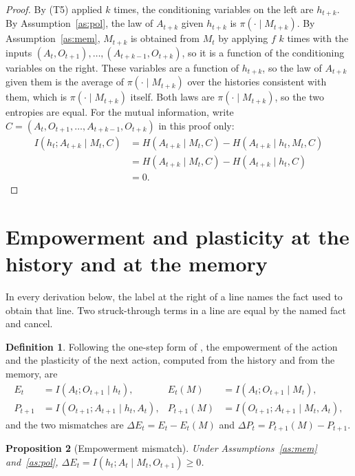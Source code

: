 \documentclass{article}
\newtheorem{proposition}{Proposition}[section]
\theoremstyle{definition}
\newtheorem{definition}[proposition]{Definition}
\theoremstyle{remark}
\newcommand{\dE}{\Delta E}
\newcommand{\dP}{\Delta P}
\newcommand{\why}[1]{\tag*{\small(#1)}}
\begin{document}
\begin{proof}
By (T5) applied $k$ times, the conditioning variables on the left are $h_{t+k}$. By Assumption~\ref{as:pol}, the law of $A_{t+k}$ given $h_{t+k}$ is $\pi(\cdot\mid M_{t+k})$. By Assumption~\ref{as:mem}, $M_{t+k}$ is obtained from $M_t$ by applying $f$ $k$ times with the inputs $(A_t,O_{t+1}),\dots,(A_{t+k-1},O_{t+k})$, so it is a function of the conditioning variables on the right. These variables are a function of $h_{t+k}$, so the law of $A_{t+k}$ given them is the average of $\pi(\cdot\mid M_{t+k})$ over the histories consistent with them, which is $\pi(\cdot\mid M_{t+k})$ itself. Both laws are $\pi(\cdot\mid M_{t+k})$, so the two entropies are equal. For the mutual information, write $C=(A_t,O_{t+1},\dots,A_{t+k-1},O_{t+k})$ in this proof only:
\begin{align*}
I(h_t;A_{t+k}\mid M_t,C)
&=H(A_{t+k}\mid M_t,C)-H(A_{t+k}\mid h_t,M_t,C) \why{T1}\\
&=H(A_{t+k}\mid M_t,C)-H(A_{t+k}\mid h_t,C) \why{T4}\\
&=0 \why{the equality of entropies above}.
\end{align*}
\end{proof}
\section{Empowerment and plasticity at the history and at the memory}\label{sec:EP}

In every derivation below, the label at the right of a line names the fact used to obtain that line. Two struck-through terms in a line are equal by the named fact and cancel.

\begin{definition}\label{def:EP}
Following the one-step form of \citet{abel2025plasticity}, the empowerment of the action and the plasticity of the next action, computed from the history and from the memory, are
\begin{align*}
E_t&=I(A_t;O_{t+1}\mid h_t), & E_t(M)&=I(A_t;O_{t+1}\mid M_t),\\
P_{t+1}&=I(O_{t+1};A_{t+1}\mid h_t,A_t), & P_{t+1}(M)&=I(O_{t+1};A_{t+1}\mid M_t,A_t),
\end{align*}
and the two mismatches are $\dE_t=E_t-E_t(M)$ and $\dP_t=P_{t+1}(M)-P_{t+1}$.
\end{definition}

\begin{proposition}[Empowerment mismatch]\label{prop:dE}
Under Assumptions~\ref{as:mem} and~\ref{as:pol}, $\dE_t=I(h_t;A_t\mid M_t,O_{t+1})\ge0$.
\end{proposition}
\end{document}

